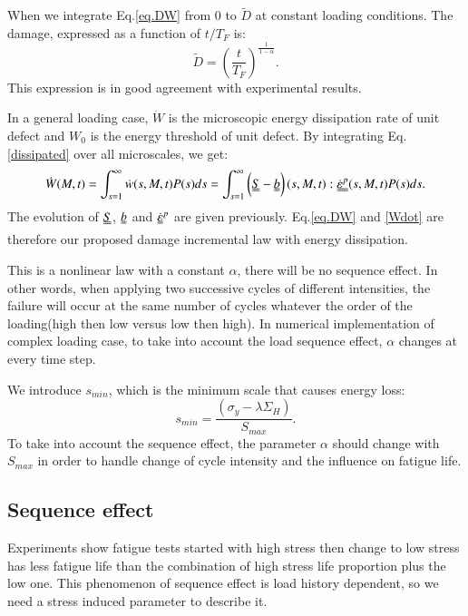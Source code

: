 \documentclass[3p,times,number,review]{elsarticle}
\begin{document}
When we integrate Eq.\eqref{eq.DW} from $0$ to $\tilde{D}$ at constant loading conditions. The damage, expressed as a function of $t/T_F$ is:
\begin{equation}
\tilde{D}=\left( \frac{t}{T_F}\right) ^{\frac{1}{1-\alpha}}.
\label{eqD}
\end{equation}
This expression is in good agreement with experimental results\cite{lemaitre1990mechanics}. 

In a general loading case, $\dot{W}$ is the microscopic energy dissipation rate of unit defect and $W_0$ is the energy threshold of unit defect. By integrating Eq.\eqref{dissipated} over all microscales, we get:
\begin{equation}\dot{W}(M,t)=\int_{s=1}^{\infty}\dot{w}(s,M,t)P(s)ds=\int_{s=1}^{\infty}\left(\uuline{S}-\uuline{b} \right) (s,M,t):\uuline{\dot{\varepsilon}^p}(s,M,t)P(s)ds.\label{Wdot}
\end{equation}
The evolution of $\uuline{S}$, $\uuline{b}$ and $\uuline{\dot{\varepsilon}}^p$ are given previously. Eq.\eqref{eq.DW} and \eqref{Wdot} are therefore our proposed damage incremental law with energy dissipation.

This is a nonlinear law with a constant $\alpha$, there will be no sequence effect. In other words,
when applying two successive cycles of different intensities, the failure will occur at the same number of cycles whatever the order of the loading(high then low versus low then high). In numerical implementation of complex loading case, to take into account the load sequence effect, $\alpha$ changes at every time step.

We introduce $s_{min}$, which is the minimum scale that causes energy loss:
\begin{equation}
s_{min}=\dfrac{\left(\sigma_y-\lambda \Sigma_H\right)}{S_{max}}.
\label{eq.smin}
\end{equation}
To take into account the sequence effect, the parameter $\alpha$ should change with $S_{max}$ in order to handle change of cycle intensity and the influence on fatigue life.

\subsection{Sequence effect}

Experiments show fatigue tests started with high stress then change to low stress has less fatigue life than the combination of high stress life proportion plus the low one. This phenomenon of sequence effect is load history dependent, so we need a stress induced parameter to describe it. 
\end{document}
